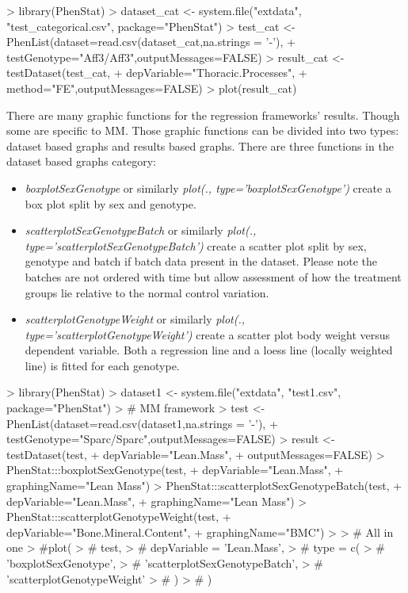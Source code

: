 \documentclass[a4paper]{article}
\begin{document}
\begin{Schunk}
\begin{Sinput}
> library(PhenStat)
> dataset_cat <- system.file("extdata", "test_categorical.csv", package="PhenStat")
> test_cat <- PhenList(dataset=read.csv(dataset_cat,na.strings = '-'),
+                      testGenotype="Aff3/Aff3",outputMessages=FALSE)
> result_cat <- testDataset(test_cat,
+                           depVariable="Thoracic.Processes",
+                           method="FE",outputMessages=FALSE)
> plot(result_cat)
\end{Sinput}
\end{Schunk}

There are many graphic functions for the regression frameworks' results. Though some are specific to MM.
Those graphic functions can be divided into two types: dataset based
graphs and results based graphs.
There are three functions in the dataset based graphs category:
\begin{itemize}
\item \textit{boxplotSexGenotype} or similarly \textit{plot(., type='boxplotSexGenotype')}  create a box plot split by sex and genotype.
\item \textit{scatterplotSexGenotypeBatch} or similarly \textit{plot(., type='scatterplotSexGenotypeBatch')} create a scatter plot split by sex, genotype and batch if batch data present
in the dataset. Please note the batches are not ordered with time but allow assessment of how the treatment groups
lie relative to the normal control variation.
\item \textit{scatterplotGenotypeWeight} or similarly \textit{plot(., type='scatterplotGenotypeWeight')}  create a scatter plot body weight versus dependent variable. Both a
regression line and a loess line (locally weighted line) is fitted for each genotype.
\end{itemize}

\begin{Schunk}
\begin{Sinput}
> library(PhenStat)
> dataset1 <- system.file("extdata", "test1.csv", package="PhenStat")
> # MM framework
> test <- PhenList(dataset=read.csv(dataset1,na.strings = '-'),
+                  testGenotype="Sparc/Sparc",outputMessages=FALSE)
> result <- testDataset(test,
+                       depVariable="Lean.Mass",
+                       outputMessages=FALSE)
> PhenStat:::boxplotSexGenotype(test,
+                               depVariable="Lean.Mass",
+                               graphingName="Lean Mass")
> PhenStat:::scatterplotSexGenotypeBatch(test,
+                                        depVariable="Lean.Mass",
+                                        graphingName="Lean Mass")
> PhenStat:::scatterplotGenotypeWeight(test,
+                                      depVariable="Bone.Mineral.Content",
+                                      graphingName="BMC")
> 
> # All in one
> #plot(
> #  test,
> #  depVariable = 'Lean.Mass',
> #  type = c(
> #  'boxplotSexGenotype',
> #  'scatterplotSexGenotypeBatch',
> #  'scatterplotGenotypeWeight'
> #  )
> #  )
\end{Sinput}
\end{Schunk}
\end{document}
